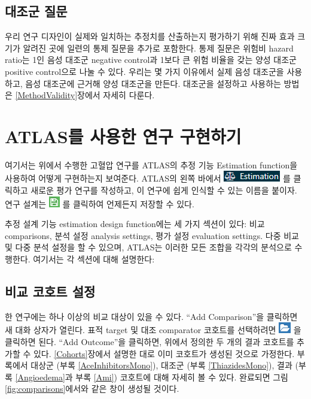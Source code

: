 \documentclass[10.5pt]{book}
\theoremstyle{definition}
\theoremstyle{definition}
\theoremstyle{definition}
\theoremstyle{remark}
\begin{document}
\subsection{대조군 질문}\label{-}

우리 연구 디자인이 실제와 일치하는 추정치를 산출하는지 평가하기 위해
진짜 효과 크기가 알려진 곳에 일련의 통제 질문을 추가로 포함한다. 통제
질문은 위험비 hazard ratio는 1인 음성 대조군 negative control과 1보다 큰
위험 비율을 갖는 양성 대조군 positive control으로 나눌 수 있다. 우리는
몇 가지 이유에서 실제 음성 대조군을 사용하고, 음성 대조군에 근거해 양성
대조군을 만든다. 대조군을 설정하고 사용하는 방법은
\ref{MethodValidity}장에서 자세히 다룬다.

\section{ATLAS를 사용한 연구 구현하기}\label{PleAtlas}

여기서는 위에서 수행한 고혈압 연구를 ATLAS의 추정 기능 Estimation
function을 사용하여 어떻게 구현하는지 보여준다. ATLAS의 왼쪽 바에서
\includegraphics{images/PopulationLevelEstimation/estimation.png} 를
클릭하고 새로운 평가 연구를 작성하고, 이 연구에 쉽게 인식할 수 있는
이름을 붙이자. 연구 설계는
\includegraphics{images/PopulationLevelEstimation/save.png} 를 클릭하여
언제든지 저장할 수 있다.

추정 설계 기능 estimation design function에는 세 가지 섹션이 있다: 비교
comparisons, 분석 설정 analysis settings, 평가 설정 evaluation settings.
다중 비교 및 다중 분석 설정을 할 수 있으며, ATLAS는 이러한 모든 조합을
각각의 분석으로 수행한다. 여기서는 각 섹션에 대해 설명한다:

\subsection{비교 코호트 설정}\label{ComparisonSettings}

한 연구에는 하나 이상의 비교 대상이 있을 수 있다. ``Add Comparison''을
클릭하면 새 대화 상자가 열린다. 표적 target 및 대조 comparator 코호트를
선택하려면 \includegraphics{images/PopulationLevelEstimation/open.png}
을 클릭하면 된다. ``Add Outcome''을 클릭하면, 위에서 정의한 두 개의 결과
코호트를 추가할 수 있다. \ref{Cohorts}장에서 설명한 대로 이미 코호트가
생성된 것으로 가정한다. 부록에서 대상군 (부록 \ref{AceInhibitorsMono}),
대조군 (부록 \ref{ThiazidesMono}), 결과 (부록 \ref{Angioedema}과 부록
\ref{Ami}) 코호트에 대해 자세히 볼 수 있다. 완료되면 그림
\ref{fig:comparisons}에서와 같은 창이 생성될 것이다.
\end{document}
